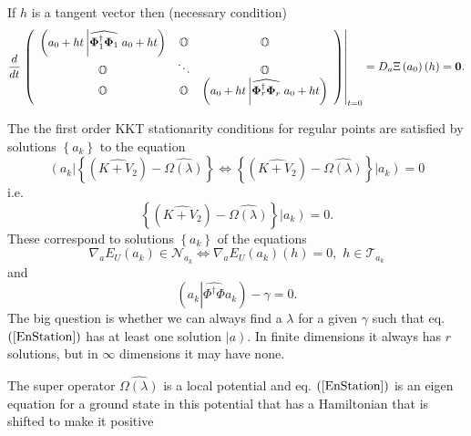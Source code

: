 \documentclass[aps,preprint]{revtex4}%
\begin{document}
If $h$ is a tangent vector then (necessary condition)
\begin{equation}
\frac{d}{dt}\left.  \left(
\begin{array}
[c]{ccc}%
\left(  a_{0}+ht\left\vert \widehat{\mathbf{\Phi}_{1}^{\dagger}\mathbf{\Phi
}_{1}}\right.  a_{0}+ht\right)   & \mathbb{O} & \mathbb{O}\\
\mathbb{O} & \ddots & \mathbb{O}\\
\mathbb{O} & \mathbb{O} & \left(  a_{0}+ht\left\vert \widehat{\mathbf{\Phi
}_{r}^{\dagger}\mathbf{\Phi}_{r}}\right.  a_{0}+ht\right)
\end{array}
\right)  \right\vert _{t=0}=D_{a}\Xi\left(  a_{0}\right)  \left(  h\right)
=\mathbf{0.}%
\end{equation}


The the first order KKT stationarity conditions for regular points are
satisfied by solutions $\left\{  a_{k}\right\}  $ to the equation
\begin{equation}
\left(  \overset{}{a_{k}}\right\vert \left\{  \left(  \widehat{K+V_{2}%
}\right)  -\widehat{\Omega\left(  \lambda\right)  }\right\}  \Leftrightarrow
\left\{  \left(  \widehat{K+V_{2}}\right)  -\widehat{\Omega\left(
\lambda\right)  }\right\}  \left\vert \overset{}{a_{k}}\right)  =0
\label{EnStation}%
\end{equation}
i.e.
\begin{equation}
\left\{  \left(  \widehat{K+V_{2}}\right)  -\widehat{\Omega\left(
\lambda\right)  }\right\}  \left\vert \overset{}{a_{k}}\right)  =0.
\end{equation}
These correspond to solutions $\left\{  a_{k}\right\}  $ of the equations
\begin{equation}
\nabla_{a}E_{U}\left(  a_{k}\right)  \in\mathcal{N}_{a_{k}}\Leftrightarrow
\nabla_{a}E_{U}\left(  a_{k}\right)  \left(  h\right)  =0,\,\,h\in
\mathcal{T}_{a_{k}}%
\end{equation}
and
\begin{equation}
\left(  a_{k}\left\vert \widehat{\Phi^{\dagger}\Phi}\right.  a_{k}\right)
-\gamma=0. \label{surface}%
\end{equation}
The big question is whether we can always find a $\lambda$ for a given
$\gamma$ such that eq. $\left(  \ref{EnStation}\right)  $ has at least one
solution $\left\vert \overset{}{a}\right)  .$ In finite dimensions it always
has $r$ solutions, but in $\infty$ dimensions it may have none.

The super operator $\widehat{\Omega\left(  \lambda\right)  }$ is a local
potential and eq. $\left(  \ref{EnStation}\right)  $ is an eigen equation for
a ground state in this potential that has a Hamiltonian that is shifted to
make it positive
\end{document}
